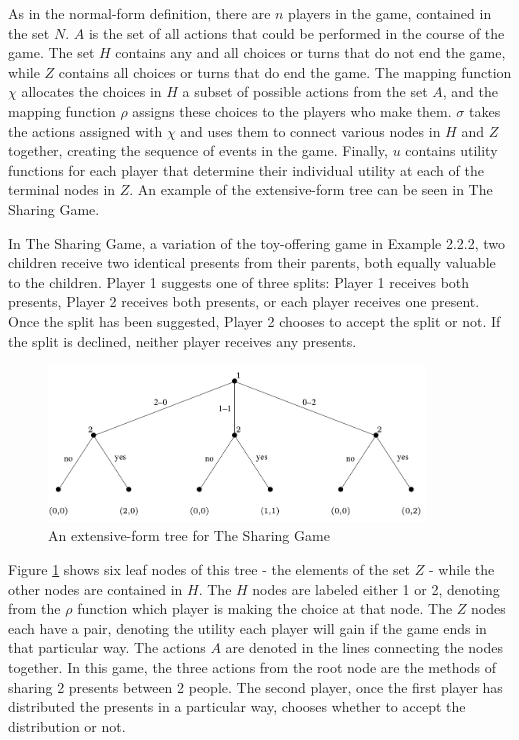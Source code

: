 As in the normal-form definition, there are $n$ players in the game, contained in the set $N$. $A$ is the set of all actions that could be performed in the course of the game. The set $H$ contains any and all choices or turns that do not end the game, while $Z$ contains all choices or turns that do end the game. The mapping function $\chi$ allocates the choices in $H$ a subset of possible actions from the set $A$, and the mapping function $\rho$ assigns these choices to the players who make them. $\sigma$ takes the actions assigned with $\chi$ and uses them to connect various nodes in $H$ and $Z$ together, creating the sequence of events in the game. Finally, $u$ contains utility functions for each player that determine their individual utility at each of the terminal nodes in $Z$. An example of the extensive-form tree can be seen in The Sharing Game.\\

\begin{exmp}
  In The Sharing Game, a variation of the toy-offering game in Example 2.2.2, two children receive two identical presents from their parents, both equally valuable to the children. Player 1 suggests one of three splits: Player 1 receives both presents, Player 2 receives both presents, or each player receives one present. Once the split has been suggested, Player 2 chooses to accept the split or not. If the split is declined, neither player receives any presents.

  \begin{figure}[H]
    \centering
    \includegraphics[width=10cm]{figures/ExampleTree.png}
    \caption{An extensive-form tree for The Sharing Game \cite{shoh09}}
    \label{fig:sharingTree}
  \end{figure}
\end{exmp}

Figure \ref{fig:sharingTree} shows six leaf nodes of this tree - the elements of the set $Z$ - while the other nodes are contained in $H$. The $H$ nodes are labeled either 1 or 2, denoting from the $\rho$ function which player is making the choice at that node. The $Z$ nodes each have a pair, denoting the utility each player will gain if the game ends in that particular way. The actions $A$ are denoted in the lines connecting the nodes together. In this game, the three actions from the root node are the methods of sharing 2 presents between 2 people. The second player, once the first player has distributed the presents in a particular way, chooses whether to accept the distribution or not.\\

